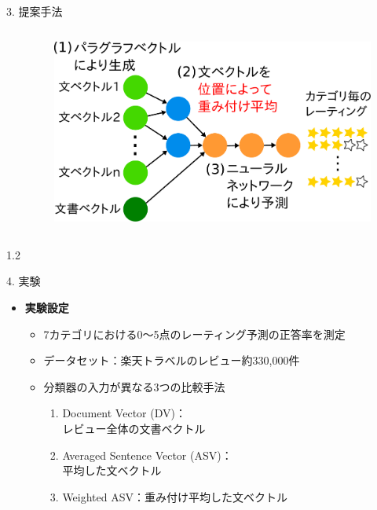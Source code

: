 \documentclass[unicode,10pt]{beamer}
\newlength{\mycolumnwidth}
\newcommand{\itemtitle}[1]{\textbf{#1}\\}
\begin{document}
\begin{frame}
\begin{block}{3. 提案手法}
\begin{columns}[onlytextwidth,t]
\begin{column}{\mycolumnwidth}
    \end{column}
    \begin{column}{\mycolumnwidth}
      \begin{figure}
        \includegraphics[width=0.95\linewidth]
                        {fig/model_with_detailed_processes.pdf}
      \end{figure}
    \end{column}
  \end{columns}
\end{block}

\begin{columns}[onlytextwidth,t]
  \begin{column}{1.2\mycolumnwidth}
    \begin{block}{4. 実験}
      \begin{itemize}
        \item \itemtitle{実験設定}
          \begin{itemize}
            \item 7カテゴリにおける0〜5点のレーティング予測の正答率を測定
            \item データセット：楽天トラベルのレビュー約330,000件
            \item 分類器の入力が異なる3つの比較手法
              \begin{enumerate}
                \item Document Vector (DV)：\\レビュー全体の文書ベクトル
                \item Averaged Sentence Vector (ASV)：\\平均した文ベクトル
                \item Weighted ASV：重み付け平均した文ベクトル
              \end{enumerate}
          \end{itemize}
      \end{itemize}


\end{block}
\end{column}
\end{columns}
\end{frame}
\end{document}
